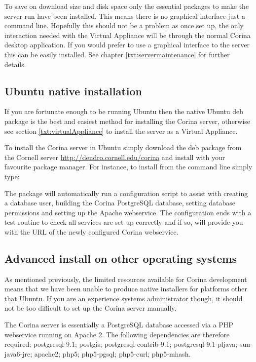 To save on download size and disk space only the essential packages to make the server run have been installed.  This means there is no graphical interface just a command line.  Hopefully this should not be a problem as once set up, the only interaction needed with the Virtual Appliance will be through the normal Corina desktop application.  If you would prefer to use a graphical interface to the server this can be easily installed.  See chapter \ref{txt:servermaintenance} for further details.


\subsection{Ubuntu native installation}
\label{txt:installnativeserver}
If you are fortunate enough to be running Ubuntu then the native Ubuntu deb package is the best and easiest method for installing the Corina server, otherwise see section \ref{txt:virtualAppliance} to install the server as a Virtual Appliance.  

To install the Corina server in Ubuntu simply download the deb package from the Cornell server \url{http://dendro.cornell.edu/corina} and install with your favourite package manager.  For instance, to install from the command line simply type:  

The package will automatically run a configuration script to assist with creating a database user, building the Corina PostgreSQL database, setting database permissions and setting up the Apache webservice.  The configuration ends with a test routine to check all services are set up correctly and if so, will provide you with the URL of the newly configured Corina webservice.

\subsection{Advanced install on other operating systems}
\label{txt:installadvancedserver}
As mentioned previously, the limited resources available for Corina development means that we have been unable to produce native installers for platforms other that Ubuntu.  If you are an experience systems administrator though, it should not be too difficult to set up the Corina server manually.  

The Corina server is essentially a PostgreSQL database accessed via a PHP webservice running on Apache 2.  The following dependencies are therefore required: postgresql-9.1; postgis; postgresql-contrib-9.1; postgresql-9.1-pljava; sun-java6-jre; apache2; php5; php5-pgsql; php5-curl; php5-mhash.

